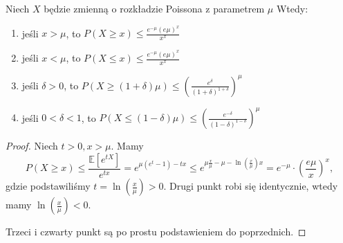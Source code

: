 \begin{theorem}
    Niech $X$ będzie zmienną o rozkładzie Poissona z parametrem $\mu$ Wtedy:
    \begin{enumerate}
        \item jeśli $x>\mu$, to $P \left( X \ge x \right) \le \frac{e^{-\mu} \left( e\mu \right) ^{x}}{x^{x}}$
        \item jeśli $x < \mu$, to $P \left( X \le x \right) \le \frac{e^{-\mu} \left( e\mu \right) ^{x}}{x^{x}}$
        \item jeśli $\delta > 0$, to $P \left( X \ge \left( 1+\delta \right) \mu \right) \le \left( \frac{e^{\delta}}{ \left( 1+\delta \right) ^{1+\delta}} \right) ^{\mu}$
        \item jeśli $0 < \delta < 1$, to $P \left( X \le \left( 1-\delta \right) \mu \right) \le \left( \frac{e^{-\delta}}{ \left( 1-\delta \right) ^{1-\delta}} \right) ^{\mu}$
    \end{enumerate}
\end{theorem}
\begin{proof}
    Niech $t>0, x>\mu$. Mamy $$ P \left( X\ge x \right) \le \frac{\mathbb{E} \left[ e^{tX} \right] }{e^{tx}} = e^{\mu \left( e^{t}-1 \right) -tx}  \le e^{\mu \frac{x}{\mu}- \mu-\ln \left( \frac{x}{\mu} \right) x} = e^{-\mu}\cdot \left( \frac{e\mu}{x} \right) ^{x} ,$$ 
    gdzie podstawiliśmy $t= \ln \left( \frac{x}{\mu} \right) > 0 $. Drugi punkt robi się identycznie, wtedy mamy $\ln \left( \frac{x}{\mu} \right) < 0$.

    Trzeci i czwarty punkt są po prostu podstawieniem do poprzednich.
\end{proof}

